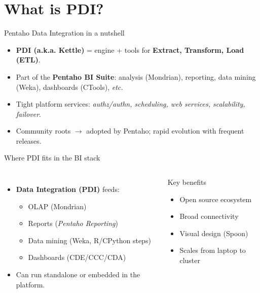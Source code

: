 \documentclass[aspectratio=169]{beamer}
\begin{document}
\section{What is PDI?}

\begin{frame}{Pentaho Data Integration in a nutshell}
    \begin{itemize}
    \item \textbf{PDI (a.k.a. Kettle)} = engine + tools for \textbf{Extract, Transform, Load (ETL)}.
    \item Part of the \textbf{Pentaho BI Suite}: analysis (Mondrian), reporting, data mining (Weka), dashboards (CTools), \textit{etc.}
    \item Tight platform services: \textit{authz/authn, scheduling, web services, scalability, failover}.
    \item Community roots \(\rightarrow\) adopted by Pentaho; rapid evolution with frequent releases.
    \end{itemize}
\end{frame}

\begin{frame}{Where PDI fits in the BI stack}
    \begin{columns}[T,onlytextwidth]
            \begin{itemize}
                \item \textbf{Data Integration (PDI)} feeds:
                \begin{itemize}
                    \item OLAP (Mondrian)
                    \item Reports (\emph{Pentaho Reporting})
                    \item Data mining (Weka, R/CPython steps)
                    \item Dashboards (CDE/CCC/CDA)
                \end{itemize}
                \item Can run standalone or embedded in the platform.
            \end{itemize}
            \begin{block}{Key benefits}
                \begin{itemize}
                    \item Open source ecosystem
                    \item Broad connectivity
                    \item Visual design (Spoon)
                    \item Scales from laptop to cluster
                \end{itemize}
            \end{block}
    \end{columns}
\end{frame}
\end{document}
